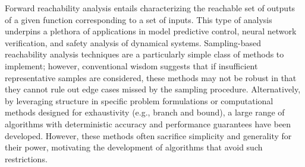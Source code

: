 \documentclass[12pt]{l4dc2022} %
\begin{document}
Forward reachability analysis entails characterizing the reachable set of outputs of a given function corresponding to a set of inputs.
This type of analysis underpins a plethora of applications in model predictive control, neural network verification, and safety analysis of dynamical systems. 
Sampling-based reachability analysis techniques are a particularly simple class of methods to implement; however, conventional wisdom suggests that if insufficient representative samples %
are considered, these methods may not be robust in that they cannot rule out edge cases missed by the sampling procedure. 
% 
Alternatively, by leveraging structure in specific problem formulations or computational methods designed for exhaustivity (e.g., branch and bound), a large range of algorithms with deterministic accuracy and performance guarantees have been developed. However, these methods often sacrifice simplicity and generality for their power, motivating the development of algorithms that avoid such restrictions.
\end{document}
